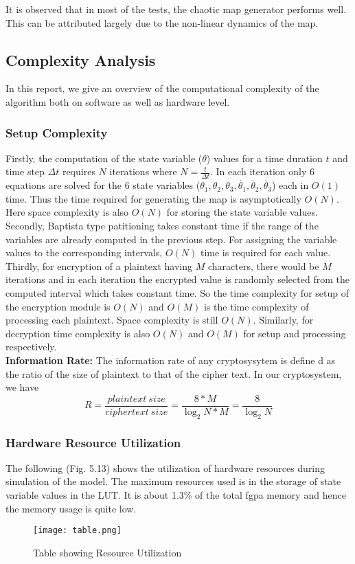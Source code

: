 It is observed that in most of the tests, the chaotic map generator performs well. This can be attributed largely due to the non-linear dynamics of the map.

\subsection{Complexity Analysis}

In this report, we give an overview of the computational complexity of the algorithm both on software as well as hardware level.

\subsubsection{Setup Complexity}
Firstly, the computation of the state variable (${\theta}$) values for a time duration $t$ and time step $\Delta t$ requires $N$ iterations where $N= \frac{t}{\Delta t}$. In each iteration only 6 equations are solved for the 6 state variables ($\theta_{1}, \theta_{2}, \theta_{3}, \dot{\theta_{1}}, \dot{\theta_{2}}, \dot{\theta_{3}}$) each in $O(1)$ time. Thus the time required for generating the map is asymptotically $O(N)$. Here space complexity is also $O(N)$ for storing the state variable values. Secondly, Baptista type patitioning takes constant time if the range of the variables are already computed in the previous step. For assigning the variable values to the corresponding intervals, $O(N)$ time is required for each value. Thirdly, for encryption of a plaintext having $M$ characters, there would be $M$ iterations and in each iteration the encrypted value is randomly selected from the computed interval which takes constant time. So the time complexity for setup of the encryption module is $O(N)$ and $O(M)$ is the time complexity of processing each plaintext. Space complexity is still $O(N)$. Similarly, for decryption time complexity is also $O(N)$ and $O(M)$ for setup and processing respectively.\\
\textbf{Information Rate:} The information rate of any cryptosysytem is define d as the ratio of the size of plaintext to that of the cipher text. In our cryptosystem, we have
\begin{equation}
R = \frac{plaintext\ size}{ciphertext\ size} = \frac{8*M}{\log_2N*M} = \frac{8}{\log_2N}
\end{equation}
\subsubsection{Hardware Resource Utilization}
The following (Fig. 5.13) shows the utilization of hardware resources during simulation of the model. The maximum resources used is in the storage of state variable values in the LUT. It is about 1.3\% of the total fgpa memory and hence the memory usage is quite low. 
\begin{figure}[H]
\centering
\texttt{[image: table.png]}
\caption{Table showing Resource Utilization}\label{fig:table}
\end{figure}

